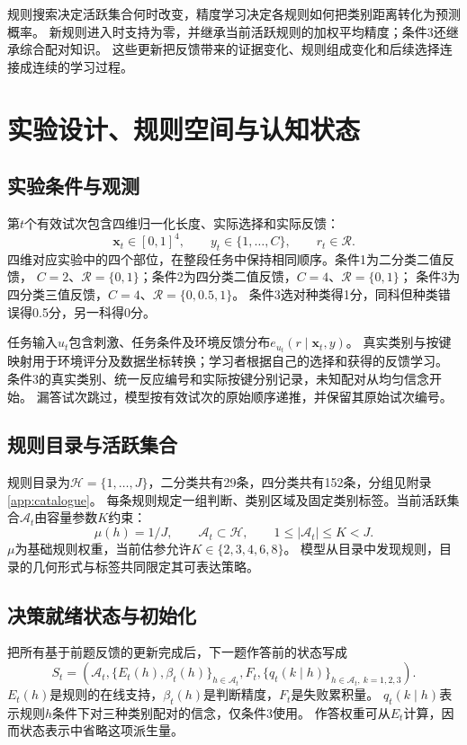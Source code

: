 \documentclass[11pt,a4paper]{article}
\numberwithin{equation}{section}
\newcommand{\A}{\mathcal{A}}
\newcommand{\Hh}{\mathcal{H}}
\newcommand{\Rr}{\mathcal{R}}
\begin{document}
规则搜索决定活跃集合何时改变，精度学习决定各规则如何把类别距离转化为预测概率。
新规则进入时支持为零，并继承当前活跃规则的加权平均精度；条件3还继承综合配对知识。
这些更新把反馈带来的证据变化、规则组成变化和后续选择连接成连续的学习过程。

\section{实验设计、规则空间与认知状态}
\label{sec:state}

\subsection{实验条件与观测}
第$t$个有效试次包含四维归一化长度、实际选择和实际反馈：
\begin{equation}
\bm x_t\in[0,1]^4,\qquad y_t\in\{1,\ldots,C\},\qquad r_t\in\Rr.
\end{equation}
四维对应实验中的四个部位，在整段任务中保持相同顺序。条件1为二分类二值反馈，
$C=2$、$\Rr=\{0,1\}$；条件2为四分类二值反馈，$C=4$、$\Rr=\{0,1\}$；
条件3为四分类三值反馈，$C=4$、$\Rr=\{0,0.5,1\}$。
条件3选对种类得1分，同科但种类错误得0.5分，另一科得0分。

任务输入$u_t$包含刺激、任务条件及环境反馈分布$e_{u_t}(r\mid\bm x_t,y)$。
真实类别与按键映射用于环境评分及数据坐标转换；学习者根据自己的选择和获得的反馈学习。
条件3的真实类别、统一反应编号和实际按键分别记录，未知配对从均匀信念开始。
漏答试次跳过，模型按有效试次的原始顺序递推，并保留其原始试次编号。

\subsection{规则目录与活跃集合}
规则目录为$\Hh=\{1,\ldots,J\}$，二分类共有29条，四分类共有152条，分组见附录\ref{app:catalogue}。
每条规则规定一组判断、类别区域及固定类别标签。当前活跃集合$\A_t$由容量参数$K$约束：
\begin{equation}
\mu(h)=1/J,\qquad \A_t\subset\Hh,\qquad 1\leq|\A_t|\leq K<J.
\label{eq:capacity}
\end{equation}
$\mu$为基础规则权重，当前估参允许$K\in\{2,3,4,6,8\}$。
模型从目录中发现规则，目录的几何形式与标签共同限定其可表达策略。

\subsection{决策就绪状态与初始化}
把所有基于前题反馈的更新完成后，下一题作答前的状态写成
\begin{equation}
S_t=\left(\A_t,\{E_t(h),\beta_t(h)\}_{h\in\A_t},F_t,
\{q_t(k\mid h)\}_{h\in\A_t,\ k=1,2,3}\right).
\label{eq:state}
\end{equation}
$E_t(h)$是规则的在线支持，$\beta_t(h)$是判断精度，$F_t$是失败累积量。
$q_t(k\mid h)$表示规则$h$条件下对三种类别配对的信念，仅条件3使用。
作答权重可从$E_t$计算，因而状态表示中省略这项派生量。
\end{document}
